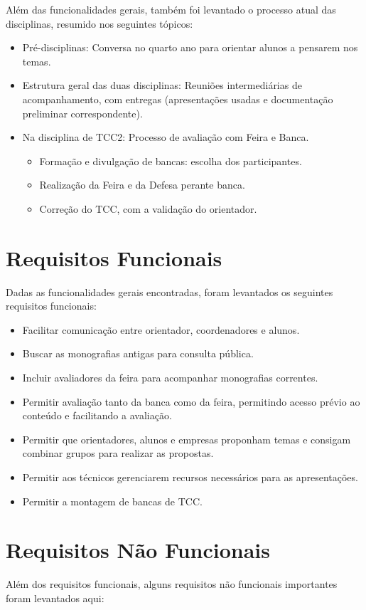 Além das funcionalidades gerais, também foi levantado o processo atual das disciplinas, resumido nos seguintes tópicos:
\begin{itemize}
    \item Pré-disciplinas: Conversa no quarto ano para orientar alunos a pensarem nos temas.
    \item Estrutura geral das duas disciplinas: Reuniões intermediárias de acompanhamento, com entregas (apresentações usadas e documentação preliminar correspondente).
    \item Na disciplina de TCC2: Processo de avaliação com Feira e Banca.
    \begin{itemize}
        \item Formação e divulgação de bancas: escolha dos participantes.
        \item Realização da Feira e da Defesa perante banca.
        \item Correção do TCC, com a validação do orientador.
    \end{itemize}
\end{itemize}

\section{Requisitos Funcionais}
Dadas as funcionalidades gerais encontradas, foram levantados os seguintes requisitos funcionais:
\begin{itemize}
    \item Facilitar comunicação entre orientador, coordenadores e alunos.
    \item Buscar as monografias antigas para consulta pública.
    \item Incluir avaliadores da feira para acompanhar monografias correntes.
    \item Permitir avaliação tanto da banca como da feira, permitindo acesso prévio ao conteúdo e facilitando a avaliação.
    \item Permitir que orientadores, alunos e empresas proponham temas e consigam combinar grupos para realizar as propostas.
    \item Permitir aos técnicos gerenciarem recursos necessários para as apresentações.
    \item Permitir a montagem de bancas de TCC.
\end{itemize}

\section{Requisitos Não Funcionais}
Além dos requisitos funcionais, alguns requisitos não funcionais importantes foram levantados aqui:


